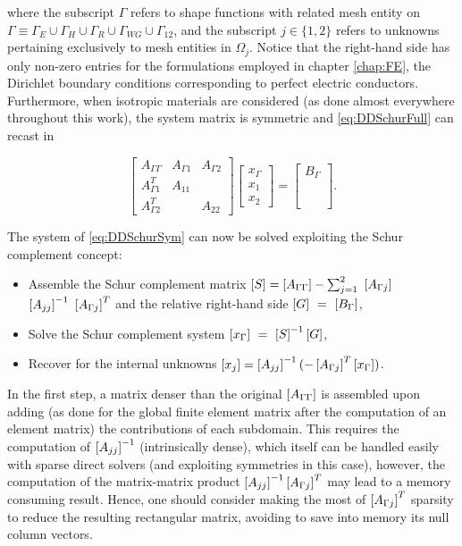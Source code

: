 \noindent where the subscript $\Gamma$ refers to shape functions with related mesh entity on $\Gamma \equiv \Gamma_E \cup \Gamma_H \cup \Gamma_R \cup \Gamma_{WG} \cup \Gamma_{12}$, and the subscript $j \in \lbrace 1,2 \rbrace$ refers to unknowns pertaining exclusively to mesh entities in $\Omega_j$. Notice that the right-hand side has only non-zero entries for the formulations employed in chapter \ref{chap:FE}, the Dirichlet boundary conditions corresponding to perfect electric conductors. Furthermore, when isotropic materials are considered (as done almost everywhere throughout this work), the system matrix is symmetric and \eqref{eq:DDSchurFull} can recast in

\begin{equation}
\label{eq:DDSchurSym}
\begin{bmatrix}
A_{\Gamma\Gamma} & A_{\Gamma1} & A_{\Gamma2}\\
A_{\Gamma1}^T & A_{11} & \\
A_{\Gamma2}^T &  & A_{22}
\end{bmatrix}
\begin{bmatrix}
x_{\Gamma}\\
x_{1}\\
x_{2}
\end{bmatrix}
=
\begin{bmatrix}
B_{\Gamma}\\
\phantom{B}\\
\phantom{B}
\end{bmatrix}.
\end{equation}

The system of \eqref{eq:DDSchurSym} can now be solved exploiting the Schur complement concept:

\begin{itemize}
\item Assemble the Schur complement matrix $\left[S\right] = \left[A_{\Gamma\Gamma}\right] - \sum_{j=1}^2~\left[A_{\Gamma j}\right]$ $\left[A_{jj}\right]^{-1}~\left[A_{\Gamma j}\right]^T$ and the relative right-hand side $\left[G\right]~=~\left[B_{\Gamma}\right]$,
\item Solve the Schur complement system $\left[x_\Gamma\right]~=~\left[S\right]^{-1} \left[G\right]$,
\item Recover for the internal unknowns $\left[x_j\right] = \left[A_{jj}\right]^{-1} (-\left[A_{\Gamma j}\right]^T \left[x_\Gamma\right])$.
\end{itemize}

In the first step, a matrix denser than the original $\left[A_{\Gamma\Gamma}\right]$ is assembled upon adding (as done for the global finite element matrix after the computation of an element matrix) the contributions of each subdomain. This requires the computation of $\left[A_{jj}\right]^{-1}$ (intrinsically dense), which itself can be handled easily with sparse direct solvers (and exploiting symmetries in this case), however, the computation of the matrix-matrix product $\left[A_{jj}\right]^{-1} \left[A_{\Gamma j}\right]^T$ may lead to a memory consuming result. Hence, one should consider making the most of $\left[A_{\Gamma j}\right]^T$ sparsity to reduce the resulting rectangular matrix, avoiding to save into memory its null column vectors.

